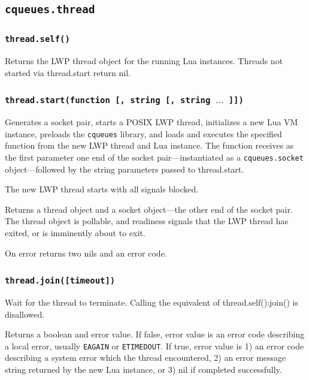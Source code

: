 \documentclass[11pt, oneside]{memoir}
\newcommand*{\cqueues}[0]{\texttt{cqueues}\xspace}
\newcommand*{\fn}[1]{\texttt{#1}\xspace}
\newcommand*{\module}[1]{\texttt{#1}\xspace}
\newcommand*{\errno}[1]{\texttt{#1}\xspace}
\newcounter{toccols}
\newenvironment{Module}[1]{
	\subsection{\texttt{#1}}
	\addtocontents{toc}{
		\protect\begin{multicols}{\value{toccols}}
	}
}{
	\addtocontents{toc}{\protect\end{multicols}}
}
\begin{document}
\begin{Module}{cqueues.thread}

\subsubsection[\fn{thread.self}]{\fn{thread.self()}}
Returns the LWP thread object for the running Lua instances. Threads not started via thread.start return nil.

\subsubsection[\fn{thread.start}]{\fn{thread.start(function [, string [, string $\ldots$ ]])}}
Generates a socket pair, starts a POSIX LWP thread, initializes a new Lua VM instance, preloads the \cqueues library, and loads and executes the specified function from the new LWP thread and Lua instance. The function receives as the first parameter one end of the socket pair---instantiated as a \module{cqueues.socket} object---followed by the string parameters passed to thread.start.

The new LWP thread starts with all signals blocked.

Returns a thread object and a socket object---the other end of the socket pair. The thread object is pollable, and readiness signals that the LWP thread has exited, or is imminently about to exit.

On error returns two nils and an error code.

\subsubsection[\fn{thread:join}]{\fn{thread.join([timeout])}}
Wait for the thread to terminate. Calling the equivalent of thread.self():join() is disallowed.

Returns a boolean and error value. If false, error value is an error code describing a local error, usually \errno{EAGAIN} or \errno{ETIMEDOUT}. If true, error value is 1) an error code describing a system error which the thread encountered, 2) an error message string returned by the new Lua instance, or 3) nil if completed successfully.

\end{Module}
\end{document}
